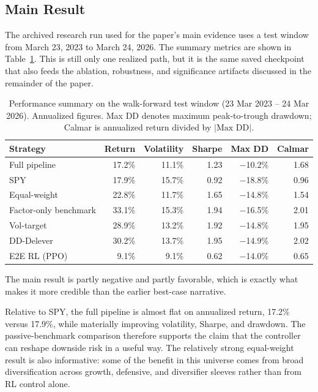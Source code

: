 \documentclass[11pt]{article}
\begin{document}
\subsection{Main Result}

The archived research run used for the paper's main evidence uses a test window
from March 23, 2023 to March 24, 2026. The summary metrics are shown in
Table~\ref{tab:metrics}. This is still only one realized path, but it is the
same saved checkpoint that also feeds the ablation, robustness, and significance
artifacts discussed in the remainder of the paper.

\begin{table}[H]
\centering
\caption{Performance summary on the walk-forward test window
  (23 Mar 2023 -- 24 Mar 2026). Annualized figures. Max DD denotes maximum
  peak-to-trough drawdown; Calmar is annualized return divided by $|\text{Max DD}|$.}
\label{tab:metrics}
\begin{tabular}{@{} l r r r r r @{}}
\toprule
\textbf{Strategy} & \textbf{Return} & \textbf{Volatility} & \textbf{Sharpe} & \textbf{Max DD} & \textbf{Calmar} \\
\midrule
Full pipeline            & 17.2\% & 11.1\% & 1.23 & $-$10.2\% & 1.68 \\
SPY                      & 17.9\% & 15.7\% & 0.92 & $-$18.8\% & 0.96 \\
Equal-weight            & 22.8\% & 11.7\% & 1.65 & $-$14.8\% & 1.54 \\
Factor-only benchmark    & 33.1\% & 15.3\% & 1.94 & $-$16.5\% & 2.01 \\
Vol-target               & 28.9\% & 13.2\% & 1.92 & $-$14.8\% & 1.95 \\
DD-Delever               & 30.2\% & 13.7\% & 1.95 & $-$14.9\% & 2.02 \\
E2E RL (PPO)             & 9.1\% & 9.1\% & 0.62 & $-$14.0\% & 0.65 \\
\bottomrule
\end{tabular}
\end{table}

The main result is partly negative and partly favorable, which is exactly what
makes it more credible than the earlier best-case narrative.

Relative to SPY, the full pipeline is almost flat on annualized return, 17.2\%
versus 17.9\%, while materially improving volatility, Sharpe, and drawdown. The
passive-benchmark comparison therefore supports the claim that the controller
can reshape downside risk in a useful way.
The relatively strong equal-weight result is also informative: some of the
benefit in this universe comes from broad diversification across growth,
defensive, and diversifier sleeves rather than from RL control alone.
\end{document}
